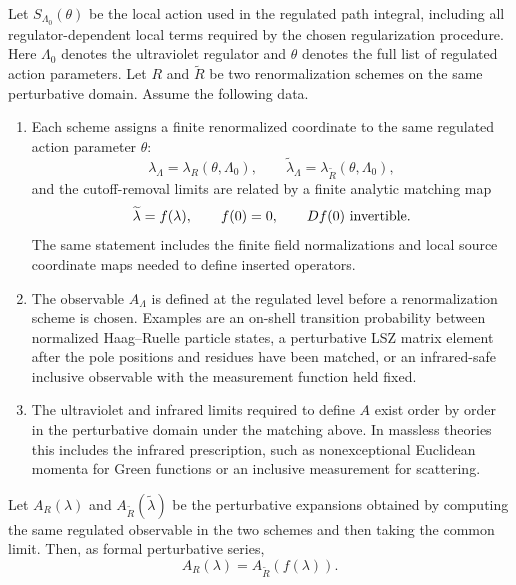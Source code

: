 \begin{remark}
\label{rem:scheme-equivalence-physical-observables}
Let \(S_{\Lambda_0}(\theta)\) be the local action used in the regulated path
integral, including all regulator-dependent local terms required by the chosen
regularization procedure.  Here \(\Lambda_0\) denotes the ultraviolet regulator
and \(\theta\) denotes the full list of regulated action parameters.  Let
\(R\) and \(\widetilde R\) be two renormalization schemes on the same
perturbative domain.  Assume the following data.
\begin{enumerate}
  \item Each scheme assigns a finite renormalized coordinate to the same
  regulated action parameter \(\theta\):
  \[
    \lambda_\Lambda=\lambda_R(\theta,\Lambda_0),
    \qquad
    \widetilde\lambda_\Lambda=
    \lambda_{\widetilde R}(\theta,\Lambda_0),
  \]
  and the cutoff-removal limits are related by a finite analytic matching map
  \[
    \widetilde\lambda=f(\lambda),
    \qquad f(0)=0,\qquad Df(0)\ \hbox{invertible}.
  \]
  The same statement includes the finite field normalizations and local source
  coordinate maps needed to define inserted operators.
  \item The observable \(A_\Lambda\) is defined at the regulated level before a
  renormalization scheme is chosen.  Examples are an on-shell transition
  probability between normalized Haag--Ruelle particle states, a perturbative
  LSZ matrix element after the pole positions and residues have been matched,
  or an infrared-safe inclusive observable with the measurement function held
  fixed.
  \item The ultraviolet and infrared limits required to define \(A\) exist
  order by order in the perturbative domain under the matching above.  In
  massless theories this includes the infrared prescription, such as
  nonexceptional Euclidean momenta for Green functions or an inclusive
  measurement for scattering.
\end{enumerate}
Let \(A_R(\lambda)\) and
\(A_{\widetilde R}(\widetilde\lambda)\) be the perturbative expansions obtained
by computing the same regulated observable in the two schemes and then taking
the common limit.  Then, as formal perturbative series,
\begin{equation}
  A_R(\lambda)
  =
  A_{\widetilde R}(f(\lambda)).
  \label{eq:scheme-equivalence-observable}
\end{equation}
\end{remark}

